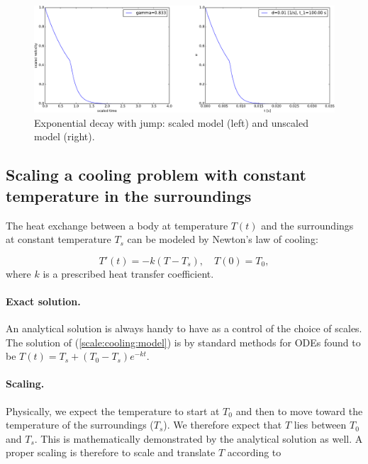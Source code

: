 \documentclass[graybox,envcountchap,sectrefs,final]{svmonodo}
\begin{document}
\begin{figure}[!ht]  %
  \centerline{\includegraphics[width=1.0\linewidth]{fig-scaling/decay_jump.pdf}}
  \caption{
  Exponential decay with jump: scaled model (left) and unscaled model (right). \label{sec:scale:jump:fig}
  }
\end{figure}



\subsection{Scaling a cooling problem with constant temperature in the surroundings}
\label{scale:cooling:const}

The heat exchange between a body at temperature $T(t)$ and the
surroundings at constant temperature $T_s$
can be modeled by Newton's law of cooling:

\begin{equation}
T'(t) = -k(T-T_s),\quad T(0)=T_0,
\label{scale:cooling:model}
\end{equation}
where $k$ is a prescribed heat transfer coefficient.

\paragraph{Exact solution.}
An analytical solution is always handy to have as a control of the
choice of scales. The solution of (\ref{scale:cooling:model})
is by standard methods for ODEs found to be
$T(t) = T_s + (T_0 - T_s)e^{-kt}$.

\paragraph{Scaling.}
Physically, we expect the temperature to start at $T_0$ and then to
move toward the temperature of the surroundings ($T_s$). We therefore
expect that $T$ lies between $T_0$ and $T_s$. This is mathematically
demonstrated by the analytical solution as well. A proper scaling is
therefore to scale and translate $T$ according to
\end{document}

